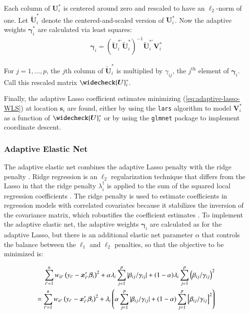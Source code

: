 \documentclass[authoryear, review, 11pt]{elsarticle}
\begin{document}
	Each column of $\bm{U}_i^*$ is centered around zero and rescaled to have an $\ell_2$-norm of one. Let $\widetilde{\bm{U}}_i^*$ denote the centered-and-scaled version of $\bm{U}_i^*$. Now the adaptive weights $\bm{\gamma}_i^*$ are calculated via least squares:	
	\begin{align}\label{eq:adaptive-weights-regression}
		\bm{\gamma}_i = \left( \widetilde{\bm{U}}_i^{*'} \widetilde{\bm{U}}_i^* \right)^{-1} \widetilde{\bm{U}}_i^{*'} \bm{V}_i^*
	\end{align}
	
	For $j=1, \dots, p$, the $j$th column of $\tilde{\bm{U}}_i^*$ is multiplied by $\gamma_{ij}$, the $j^\text{th}$ element of $\bm{\gamma}_i$. Call this rescaled matrix $\widecheck{\bm{U}}_i^*$.
	
	Finally, the adaptive Lasso coefficient estimates minimizing (\ref{eq:adaptive-lasso-WLS}) at location $\bm{s}_i$ are found, either by using the \verb!lars! algorithm \citep{Efron:2004b} to model $\bm{V}_i^*$ as a function of $\widecheck{\bm{U}}_i^*$ or by using the \verb!glmnet! package to implement coordinate descent.


	\subsubsection{Adaptive Elastic Net}
	The adaptive elastic net combines the adaptive Lasso penalty with the ridge penalty \citep{Zou:2009}. Ridge regression is an $\ell_2$ regularization technique that differs from the Lasso in that the ridge penalty $\lambda^{\dagger}_i$ is applied to the sum of the squared local regression coefficients \citep{Hoerl:1970}. The ridge penalty is used to estimate coefficients in regression models with correlated covariates because it stabilizes the inversion of the covariance matrix, which robustifies the coefficient estimates \citep{Hastie:2009}. To implement the adaptive elastic net, the adaptive weights $\bm{\gamma}_i$ are calculated as for the adaptive Lasso, but there is an additional elastic net parameter $\alpha$ that controls the balance between the $\ell_1$ and $\ell_2$ penalties, so that the objective to be minimized is:

	\begin{align}
		\sum_{i'=1}^n w_{ii'} \left(y_{i'} - \bm{x}'_{i'} \bm{\beta}_i \right)^2 + \alpha \lambda_i \sum_{j=1}^p |\beta_{ij} / \gamma_{ij}| + (1-\alpha) \lambda_i \sum_{j=1}^p  \left( \beta_{ij} / \gamma_{ij} \right)^2\notag\\
		= \sum_{i'=1}^n w_{ii'} \left(y_{i'} - \bm{x}'_{i'} \bm{\beta}_i \right)^2 + \lambda_i \left(\alpha  \sum_{j=1}^p |\beta_{ij} / \gamma_{ij}| + (1-\alpha) \sum_{j=1}^p  \left[ \beta_{ij} / \gamma_{ij} \right]^2 \right)
	\end{align}
	
\end{document}
